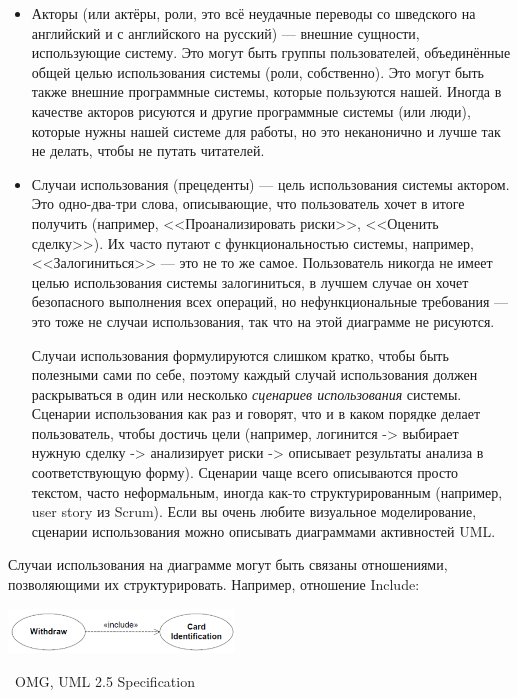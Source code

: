 \documentclass[a5paper]{article}
\newcommand{\attribution}[1] {
    \vspace{-4mm}\begin{flushright}\begin{scriptsize}%
    {\textcopyright\, #1}\end{scriptsize}\end{flushright}
}
\begin{document}
\begin{itemize}
    \item Акторы (или актёры, роли, это всё неудачные переводы со шведского на английский и с английского на русский) --- внешние сущности, использующие систему. Это могут быть группы пользователей, объединённые общей целью использования системы (роли, собственно). Это могут быть также внешние программные системы, которые пользуются нашей. Иногда в качестве акторов рисуются и другие программные системы (или люди), которые нужны нашей системе для работы, но это неканонично и лучше так не делать, чтобы не путать читателей.
    \item Случаи использования (прецеденты)  --- цель использования системы актором. Это одно-два-три слова, описывающие, что пользователь хочет в итоге получить (например, <<Проанализировать риски>>, <<Оценить сделку>>). Их часто путают с функциональностью системы, например, <<Залогиниться>> --- это не то же самое. Пользователь никогда не имеет целью использования системы залогиниться, в лучшем случае он хочет безопасного выполнения всех операций, но нефункциональные требования --- это тоже не случаи использования, так что на этой диаграмме не рисуются.

    Случаи использования формулируются слишком кратко, чтобы быть полезными сами по себе, поэтому каждый случай использования должен раскрываться в один или несколько \textit{сценариев использования} системы. Сценарии использования как раз и говорят, что и в каком порядке делает пользователь, чтобы достичь цели (например, логинится -> выбирает нужную сделку -> анализирует риски -> описывает результаты анализа в соответствующую форму). Сценарии чаще всего описываются просто текстом, часто неформальным, иногда как-то структурированным (например, user story из Scrum). Если вы очень любите визуальное моделирование, сценарии использования можно описывать диаграммами активностей UML.
\end{itemize}

Случаи использования на диаграмме могут быть связаны отношениями, позволяющими их структурировать. Например, отношение Include:

\begin{center}
    \includegraphics[width=0.45\textwidth]{useCaseInclude.png}
    \attribution{OMG, UML 2.5 Specification}
\end{center}
\end{document}
